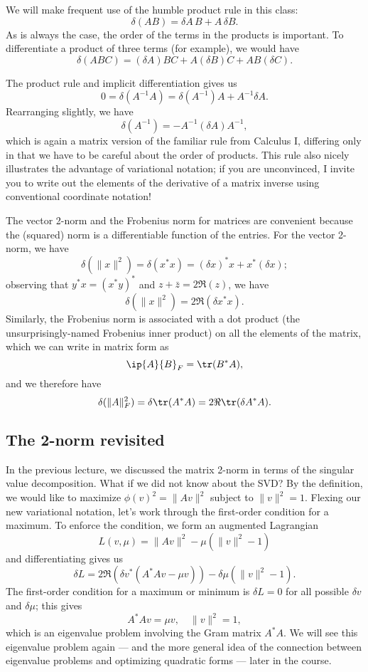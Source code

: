 We will make frequent use of the humble product rule in this class:
\[
  \delta (AB) = \delta A \, B + A \, \delta B.
\]
As is always the case, the order of the terms in the products is
important.  To differentiate a product of three terms (for example),
we would have
\[
  \delta (ABC) = (\delta A) BC + A (\delta B) C + AB(\delta C).
\]

The product rule and implicit differentiation gives us
\[
  0 = \delta (A^{-1} A) = \delta (A^{-1}) A + A^{-1} \delta A.
\]
Rearranging slightly, we have
\[
  \delta (A^{-1}) = -A^{-1} (\delta A) A^{-1},
\]
which is again a matrix version of the familiar rule from Calculus I,
differing only in that we have to be careful about the order of
products.  This rule also nicely illustrates the advantage of variational
notation; if you are unconvinced, I invite you to write out the
elements of the derivative of a matrix inverse using conventional
coordinate notation!

The vector 2-norm and the Frobenius norm for matrices are convenient
because the (squared) norm is a differentiable function of the entries.
For the vector 2-norm, we have
\[
  \delta(\|x\|^2) = \delta(x^* x) = (\delta x)^* x + x^* (\delta x);
\]
observing that $y^* x = (x^* y)^*$ and $z + \bar{z} = 2 \Re(z)$,
we have
\[
  \delta(\|x\|^2) = 2 \Re(\delta x^* x).
\]
Similarly, the Frobenius norm is associated with a dot product
(the unsurprisingly-named Frobenius inner product) on all the elements
of the matrix, which we can write in matrix form as
\[
  \ip{A}{B}_F = \tr(B^* A),
\]
and we therefore have
\[
  \delta (\|A\|_F^2) = \delta \tr(A^* A) = 2 \Re \tr(\delta A^* A).
\]

\subsection{The 2-norm revisited}

In the previous lecture, we discussed the matrix 2-norm in terms
of the singular value decomposition.  What if we did not know about
the SVD?  By the definition, we would like to maximize
$\phi(v)^2 = \|Av\|^2$ subject to $\|v\|^2 = 1$.  Flexing our
new variational notation, let's work through the first-order condition
for a maximum.  To enforce the condition, we form an augmented
Lagrangian
\[
  L(v,\mu) = \|Av\|^2 - \mu (\|v\|^2 - 1)
\]
and differentiating gives us
\[
  \delta L = 2 \Re (\delta v^* (A^* A v - \mu v)) - \delta \mu (\|v\|^2 - 1).
\]
The first-order condition for a maximum or minimum is $\delta L = 0$
for all possible $\delta v$ and $\delta \mu$; this gives
\[
  A^* A v = \mu v, \quad \|v\|^2 = 1,
\]
which is an eigenvalue problem involving the Gram matrix $A^* A$.
We will see this eigenvalue problem again --- and the more general idea
of the connection between eigenvalue problems and
optimizing quadratic forms --- later in the course.

